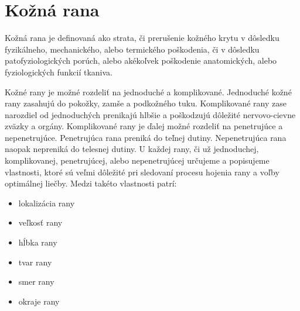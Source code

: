 \section{Kožná rana}
Kožná rana je definovaná ako strata, či prerušenie kožného krytu v dôsledku fyzikálneho, mechanického, alebo termického poškodenia, či v dôsledku patofyziologických porúch, alebo akékoľvek poškodenie anatomických, alebo fyziologických funkcií tkaniva.

Kožné rany je možné rozdeliť na jednoduché a komplikované. Jednoduché kožné rany zasahujú do pokožky, zamše a podkožného tuku. Komplikované rany zase narozdiel od jednoduchých prenikajú hlbšie a poškodzujú dôležité nervovo-cievne zväzky a orgány. Komplikované rany je ďalej možné rozdeliť na penetrujúce a nepenetrujúce. Penetrujúca rana preniká do teľnej dutiny. Nepenetrujúca rana naopak nepreniká do telesnej dutiny. U každej rany, či už jednoduchej, komplikovanej, penetrujúcej, alebo nepenetrujúcej určujeme a popisujeme vlastnosti, ktoré sú veľmi dôležité pri sledovaní procesu hojenia rany a voľby optimálnej liečby. Medzi takéto vlastnosti patrí:
\begin{itemize} 
\item lokalizácia rany
\item veľkosť rany
\item hĺbka rany
\item tvar rany
\item smer rany
\item okraje rany
\end{itemize}



